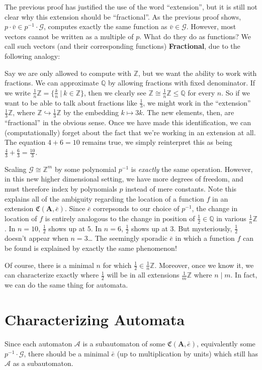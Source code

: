 \documentclass[final]{ws-ijac}
\newcommand{\A}{\mathcal{A}}
\newcommand{\G}{\mathcal{G}}
\newcommand{\C}{\mathfrak{C}(\Am,\e)}
\newcommand{\Z}{\mathbb{Z}}
\newcommand{\Q}{\mathbb{Q}}
\newcommand{\2}{\textbf{2}}
\newcommand{\Am}{\textbf{A}}
\newcommand{\vv}{\bar{v}}
\newcommand{\e}{\bar{e}}
\begin{document}
The previous proof has justified the use of the word ``extension'', 
but it is still not clear why this extension should be ``fractional''.
As the previous proof shows, $p \cdot \vv \in p^{-1} \cdot \G$, 
computes exactly the same function as $\vv \in \G$.
However, most vectors cannot be written as a multiple of $p$.
What do they do as functions?
We call such vectors (and their corresponding functions)
\textbf{Fractional}, due to the following analogy:

Say we are only allowed to compute with $\Z$, but we want the ability
to work with fractions. We can approximate $\Q$ by allowing fractions
with fixed denominator. If we write 
$\frac{1}{n} \mathbb{Z} = \{ \frac{k}{n} ~|~ k \in \Z \}$, 
then we clearly see $\Z \cong \frac{1}{n} \Z \leq \Q$ for every $n$. 
So if we want to be able to talk about fractions like 
$\frac{1}{3}$, we might work in the ``extension'' $\frac{1}{3} \Z$, where 
$\Z \hookrightarrow \frac{1}{3}\Z$ by the embedding $k \mapsto 3k$.
The new elements, then, are ``fractional'' in the obvious sense. 
Once we have made this identification, we can (computationally) forget
about the fact that we're working in an extension at all. The equation
$4 + 6 = 10$ remains true, we simply reinterpret this as being 
$\frac{4}{3} + \frac{6}{3} = \frac{10}{3}$. 

Scaling $\G \cong \Z^m$ by some polynomial $p^{-1}$ is \emph{exactly} the
same operation. However, in this new higher dimensional setting, we have 
more degrees of freedom, and must therefore index by polynomials $p$ instead
of mere constants. Note this explains all of the ambiguity regarding the
location of a function $f$ in an extension $\C$. Since $\e$ correpsonds to
our choice of $p^{-1}$, the change in location of $f$ is entirely analogous
to the change in position of $\frac{1}{2} \in \Q$ in various $\frac{1}{n}\Z$.
In $n=10$, $\frac{1}{2}$ shows up at $5$. In $n=6$, $\frac{1}{2}$ shows up 
at $3$. But mysteriously, $\frac{1}{2}$ doesn't appear when $n=3$\ldots 
The seemingly sporadic $\e$ in which a function $f$ can be found is explained
by exactly the same phenomenon!

Of course, there is a minimal $n$ for which $\frac{1}{2} \in \frac{1}{n}\Z$.
Moreover, once we know it, we can characterize exactly where $\frac{1}{2}$
will be in all extensions $\frac{1}{m}\Z$ where $n \mid m$. In fact, we can
do the same thing for automata.

\section{Characterizing Automata}
Since each automaton $\A$ is a subautomaton of some $\C$,
equivalently some $p^{-1} \cdot \G$, there should be a minimal $\e$ 
(up to multiplication by units) which still has $\A$ as a subautomaton. 
\end{document}

